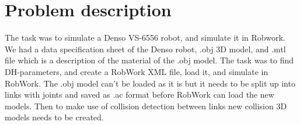 \section{Problem description}
\label{sec:description}

The task was to simulate a Denso VS-6556 robot, and simulate it in Robwork. We had a data specification sheet of the Denso robot, .obj 3D model, and .mtl file which is a description of the material of the .obj model. The task was to find DH-parameters, and create a RobWork XML file, load it,
and simulate in RobWork. The .obj model can't be loaded as it is but it needs to be split up into links with joints and saved as .ac format before RobWork can load the new models. Then to make use of collision detection between links new collision 3D models needs to be created. 
